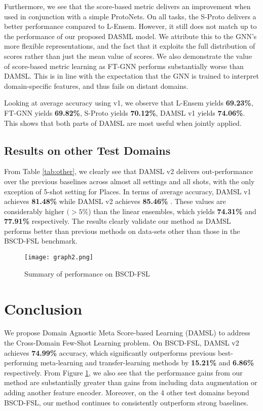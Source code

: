 \documentclass[final]{cvpr}
\begin{document}
Furthermore, we see that the score-based metric delivers an improvement when used in conjunction with a simple ProtoNets. On all tasks, the S-Proto delivers a better performance compared to L-Ensem. However, it still does not match up to the performance of our proposed DASML model. We attribute this to the GNN's more flexible representations, and the fact that it exploits the full distribution of scores rather than just the mean value of scores. We also demonstrate the value of score-based metric learning as FT-GNN performs substantially worse than DAMSL. This is in line with the expectation that the GNN is trained to interpret domain-specific features, and thus fails on distant domains.

Looking at average accuracy using v1, we observe that L-Ensem yields \textbf{69.23\%}, FT-GNN yields \textbf{69.82\%}, S-Proto yields \textbf{70.12\%}, DAMSL v1 yields \textbf{74.06\%}. This shows that both parts of DAMSL are most useful when jointly applied.  

\subsection{Results on other Test Domains}

From Table \ref{tab:other}, we clearly see that DAMSL v2 delivers out-performance over the previous baselines across almost all settings and all shots, with the only exception of 5-shot setting for Places. In terms of average accuracy, DAMSL v1 achieves \textbf{81.48\%} while DAMSL v2 achieves \textbf{85.46\%} . These values are considerably higher \((>5\%\)) than the linear ensembles, which yields \textbf{74.31\%} and \textbf{77.91\%} respectively. The results clearly validate our method as DAMSL performs better than previous methods on data-sets other than those in the BSCD-FSL benchmark.

\begin{figure}[t]
\begin{center}
   \texttt{[image: graph2.png]}
\end{center}
   \caption{Summary of performance on BSCD-FSL}
\label{fig:Summary}
\end{figure}

\section{Conclusion}

We propose Domain Agnostic Meta Score-based Learning (DAMSL) to address the Cross-Domain Few-Shot Learning problem. On BSCD-FSL, DAMSL v2 achieves \textbf{74.99\%} accuracy, which significantly outperforms previous best-performing meta-learning and transfer-learning methods by \textbf{15.21\%}  and \textbf{6.86\%} respectively. From Figure \ref{fig:Summary}, we also see that the performance gains from our method are substantially greater than gains from including data augmentation or adding another feature encoder. Moreover, on the 4 other test domains beyond BSCD-FSL, our method continues to consistently outperform strong baselines.
\end{document}
